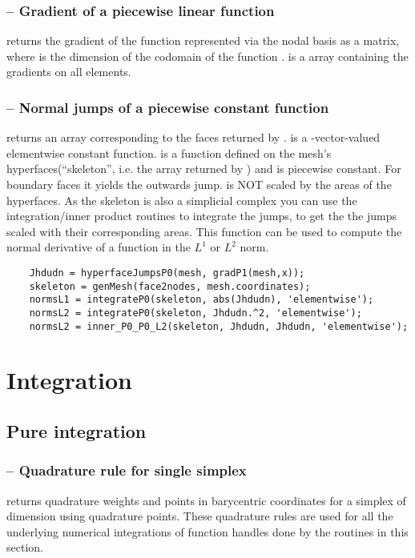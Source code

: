 \documentclass[twoside,11pt,a4paper]{article} %
\begin{document}
\subsubsection*{\texorpdfstring{ --}{} Gradient of a piecewise linear function}
 returns the gradient of the function  represented via the nodal basis as a  matrix, where  is the dimension of the codomain of the function .  is a  array containing the gradients on all elements.

\subsubsection*{\texorpdfstring{ --}{} Normal jumps of a piecewise constant function}
 returns an array  corresponding to the faces returned by .  is a -vector-valued elementwise constant function.  is a function defined on the mesh's hyperfaces(\enquote{skeleton}, i.e. the array  returned by ) and is piecewise constant. For boundary faces it yields the outwards jump.
 is NOT scaled by the areas of the hyperfaces. As the skeleton is also a simplicial complex you can use the integration/inner product routines to integrate the jumps, to get the the jumps scaled with their corresponding areas.
This function can be used to compute the normal derivative of a function  in the $L^1$ or $L^2$ norm.
\begin{lstlisting}
    Jhdudn = hyperfaceJumpsP0(mesh, gradP1(mesh,x));
    skeleton = genMesh(face2nodes, mesh.coordinates);
    normsL1 = integrateP0(skeleton, abs(Jhdudn), 'elementwise');
    normsL2 = integrateP0(skeleton, Jhdudn.^2, 'elementwise');
    normsL2 = inner_P0_P0_L2(skeleton, Jhdudn, Jhdudn, 'elementwise');
\end{lstlisting}


\section{Integration}
\subsection{Pure integration}

\subsubsection*{\texorpdfstring{ --}{} Quadrature rule for single simplex}
  returns quadrature weights and points in barycentric coordinates for a simplex of dimension  using  quadrature points.
 These quadrature rules are used for all the underlying numerical integrations of function handles done by the routines in this section.
\end{document}
